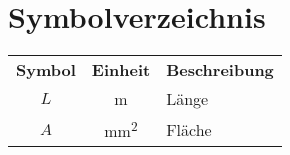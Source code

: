 \chapter*{Symbolverzeichnis}

\begin{longtable}[l]{@{}ccp{300pt}}
\textbf{Symbol}	& \textbf{Einheit} & \textbf{Beschreibung} \\
$L$	 	& \si{\meter}					& Länge\\
$A$		& \si{\milli\meter\squared}		& Fläche\\
\end{longtable}

